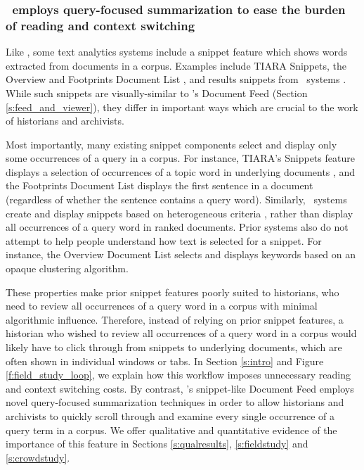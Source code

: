 \subsubsection{\ours~employs query-focused summarization to ease the burden of reading and context switching}
Like \ours, some text analytics systems include a snippet feature which shows words extracted from documents in a corpus.
Examples include TIARA \cite{tiara} Snippets, the
Overview and Footprints Document List \cite{overview,Footprints},
and results snippets from \Baselongname~systems \cite[Chp.\ 6.3]{croft2010search}.
While such snippets are visually-similar to \ours's Document Feed (Section \ref{s:feed_and_viewer}), they differ in important ways which are crucial to the work of historians and archivists.

Most importantly, many existing snippet components select and display only some occurrences of a query in a corpus.
For instance, TIARA's Snippets feature displays a selection of occurrences of a topic word in underlying documents \cite{tiara}, and the Footprints \cite{Footprints} Document List displays the first sentence in a document (regardless of whether the sentence contains a query word).
Similarly, \Baselongname~systems create and display snippets based on heterogeneous criteria \cite[Chp.\ 6]{croft2010search}, rather than display all occurrences of a query word in ranked documents.
Prior systems also do not attempt to help people understand how text is selected for a snippet.
For instance, the Overview Document List \cite{overview} selects and displays keywords based on an opaque clustering algorithm.

These properties make prior snippet features poorly suited to historians, who need to review all occurrences of a query word in a corpus with minimal algorithmic influence. 
Therefore, instead of relying on prior snippet features, a historian who wished to review all occurrences of a query word in a corpus would 
likely have to click through from snippets to underlying documents, 
which are often \cite{tiara, Gorg2013JigsawReflections, nytwebsite} shown in individual windows or tabs.
In Section \ref{s:intro} and Figure \ref{f:field_study_loop}, we explain how this workflow imposes unnecessary reading and context switching costs.
By contrast, \ours's snippet-like Document Feed employs 
novel query-focused summarization techniques in order
to allow historians and archivists to quickly scroll through and examine every single occurrence of a query term in a corpus.
We offer qualitative and quantitative evidence of the importance of this feature in Sections \ref{s:qualresults}, \ref{s:fieldstudy} and \ref{s:crowdstudy}. 